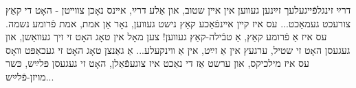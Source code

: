 \documentclass{article}
\begin{document}
\begin{pairs}

\begin{Rightside}

\begin{RTL}
\begin{hebrew}
\beginnumbering


\pstart
דרײַ זינגלפֿײגעלעך זײַנען געװען אין אײן שטוב,
 און אַלע דרײַ, אײנס נאָכן צװײטן - האָט די קאַץ צורעכט געמאַכט...
\pend
\pstart
עס איז קײן אײנפֿאַכע קאַץ
 נישט געװען, נאָר אַן אמת, אמת פֿרומע נשמה.
\pend
\pstart
עס איז אַ פֿרומע קאַץ, אַ טבֿילה-קאַץ געװען! צען מאָל אין טאָג האָט זי זיך געװאַשן, און געגעסן האָט זי שטיל, ערגעץ אין אַ זײַט, אין אַ װינקעלע...
\pend
\pstart
אַ גאַנצן טאָג האָט זי געכאַפּט
 װאָס עס איז מילכיקס, און ערשט אַז די נאַכט איז צוגעפֿאַלן, האָט זי געגעסן פּלײַש, כּשר מויזן-פֿלײַש...
\pend
\endnumbering
\end{hebrew}
\end{RTL}
\end{Rightside}





\end{pairs}
\end{document}

